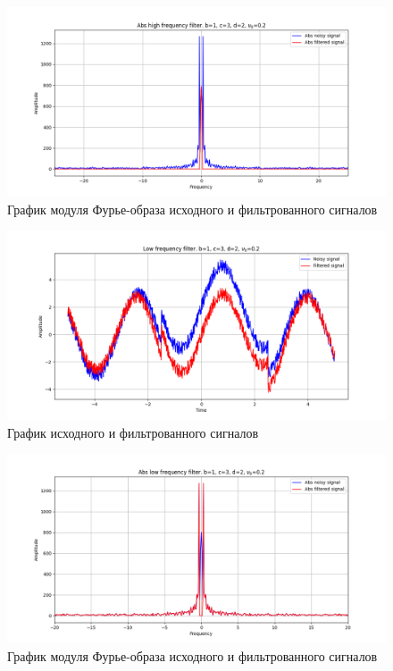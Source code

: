 \documentclass[a4paper, 12pt]{article}
\begin{document}
    \begin{figure}[!htb]
        \centering
        \includegraphics[scale=0.485]{4_abs_u_U_nospec_v3.png}
        \captionsetup{skip=0pt}
        \caption{График модуля Фурье-образа исходного и фильтрованного сигналов}
        \label{fig:fig90}
    \end{figure}
    \begin{figure}[!htb]
        \centering
        \includegraphics[scale=0.485]{4_u_flt_u_nospec_v4.png}
        \captionsetup{skip=0pt}
        \caption{График исходного и фильтрованного сигналов}
        \label{fig:fig91}
    \end{figure}
    \begin{figure}[!htb]
        \centering
        \includegraphics[scale=0.485]{4_abs_u_U_nospec_v4.png}
        \captionsetup{skip=0pt}
        \caption{График модуля Фурье-образа исходного и фильтрованного сигналов}
        \label{fig:fig92}
    \end{figure}
\end{document}
